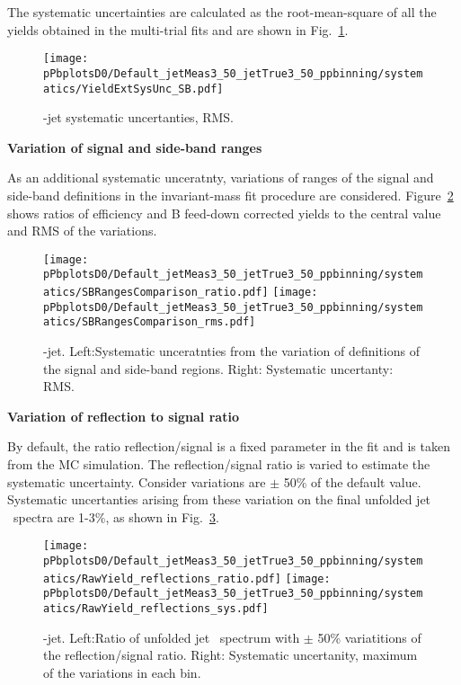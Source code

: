 The systematic uncertainties are calculated as the root-mean-square of all the yields obtained in the multi-trial fits and are shown in Fig.~\ref{fig:MultiTrialRMS_pPB_Dzero}.
\begin{figure}[bth]
\begin{center}
\texttt{[image: pPbplotsD0/Default\_jetMeas3\_50\_jetTrue3\_50\_ppbinning/systematics/YieldExtSysUnc\_SB.pdf]}
\caption{\Dzero-jet systematic uncertanties, RMS.} 
\label{fig:MultiTrialRMS_pPB_Dzero}
\end{center}
\end{figure}


\textbf{Variation of signal and side-band ranges}

As an additional systematic unceratnty, variations of ranges of the signal and side-band definitions in the invariant-mass fit procedure are considered.
Figure~\ref{fig:JetPtSys_Dzero_SBvariaton} shows ratios of efficiency and B feed-down corrected yields to the central value and RMS of the variations.

\begin{figure}[bth]
\begin{center}
\texttt{[image: pPbplotsD0/Default\_jetMeas3\_50\_jetTrue3\_50\_ppbinning/systematics/SBRangesComparison\_ratio.pdf]}
\texttt{[image: pPbplotsD0/Default\_jetMeas3\_50\_jetTrue3\_50\_ppbinning/systematics/SBRangesComparison\_rms.pdf]}
\caption{\Dzero-jet. Left:Systematic unceratnties from the variation of definitions of the signal and side-band regions. Right: Systematic uncertanty: RMS.} 
\label{fig:JetPtSys_Dzero_SBvariaton}
\end{center}
\end{figure}


\textbf{Variation of reflection to signal ratio}

By default, the ratio reflection/signal is a fixed parameter in the fit and is taken from the MC simulation. The reflection/signal ratio is varied to estimate the
systematic uncertainty. Consider variations are $\pm$ 50\% of the default value. Systematic uncertanties arising from these variation on the final unfolded jet \pt\ spectra are 1-3\%, as shown in Fig.~\ref{fig:JetPtSys_Dzero_Refl}.

\begin{figure}[bth]
\begin{center}
\texttt{[image: pPbplotsD0/Default\_jetMeas3\_50\_jetTrue3\_50\_ppbinning/systematics/RawYield\_reflections\_ratio.pdf]}
\texttt{[image: pPbplotsD0/Default\_jetMeas3\_50\_jetTrue3\_50\_ppbinning/systematics/RawYield\_reflections\_sys.pdf]}
\caption{\Dzero-jet. Left:Ratio of unfolded jet \pt\ spectrum with $\pm$ 50\% variatitions of the reflection/signal ratio. Right: Systematic uncertanity, maximum of the variations in each bin.} 
\label{fig:JetPtSys_Dzero_Refl}
\end{center}
\end{figure}


